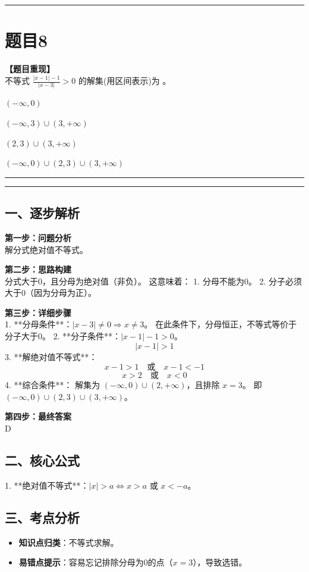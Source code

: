 \documentclass[12pt, a4paper]{ctexart}
\newcommand{\TopSeparator}{
    \par\noindent\rule{\textwidth}{1.5pt}\vspace{0.5em} %
}
\newcommand{\AnalysisSeparator}{
    \par\noindent\rule{\textwidth}{0.5pt}\vspace{0.2em}\hrule\vspace{0.5em} %
}
\newenvironment{RedAnalysis}{
    \par
    \color{red} %
}{
    \par
    \color{black} %
}
\newcommand{\choicesTwo}[4]{
    \begin{enumerate}[label=\Alph*., itemsep=0pt, parsep=0pt, topsep=5pt, labelsep=0.5em]
        \begin{minipage}{0.45\linewidth} \item #1 \end{minipage}
        \begin{minipage}{0.45\linewidth} \item #2 \end{minipage}
        \begin{minipage}{0.45\linewidth} \item #3 \end{minipage}
        \begin{minipage}{0.45\linewidth} \item #4 \end{minipage}
    \end{enumerate}
}
\begin{document}
\vspace{2em}

\TopSeparator
\section*{题目8}

\textbf{【题目重现】} \\
不等式 $ \frac{|x-1|-1}{|x-3|}>0 $ 的解集(用区间表示)为 \underline{\hspace{1cm}}。
\choicesTwo
    {$ (- \infty, 0) $}
    {$ (- \infty, 3) \cup (3, +\infty) $}
    {$ (2,3) \cup (3, +\infty) $}
    {$ (- \infty, 0) \cup (2, 3) \cup (3, +\infty) $}

\AnalysisSeparator

\begin{RedAnalysis}

\subsection*{一、逐步解析}

\textbf{第一步：问题分析} \\
解分式绝对值不等式。

\textbf{第二步：思路构建} \\
分式大于0，且分母为绝对值（非负）。
这意味着：
1. 分母不能为0。
2. 分子必须大于0（因为分母为正）。

\textbf{第三步：详细步骤} \\
1. **分母条件**：$|x-3| \ne 0 \Rightarrow x \ne 3$。
   在此条件下，分母恒正，不等式等价于分子大于0。
2. **分子条件**：$|x-1| - 1 > 0$。
   \[ |x-1| > 1 \]
3. **解绝对值不等式**：
   \[ x-1 > 1 \quad \text{或} \quad x-1 < -1 \]
   \[ x > 2 \quad \text{或} \quad x < 0 \]
4. **综合条件**：
   解集为 $(-\infty, 0) \cup (2, +\infty)$，且排除 $x=3$。
   即 $(-\infty, 0) \cup (2, 3) \cup (3, +\infty)$。

\textbf{第四步：最终答案} \\
D

\subsection*{二、核心公式}
1. **绝对值不等式**：$|x| > a \iff x > a \text{ 或 } x < -a$。

\subsection*{三、考点分析}
\begin{itemize}
    \item \textbf{知识点归类}：不等式求解。
    \item \textbf{易错点提示}：容易忘记排除分母为0的点（$x=3$），导致选错。
\end{itemize}

\end{RedAnalysis}
\end{document}
